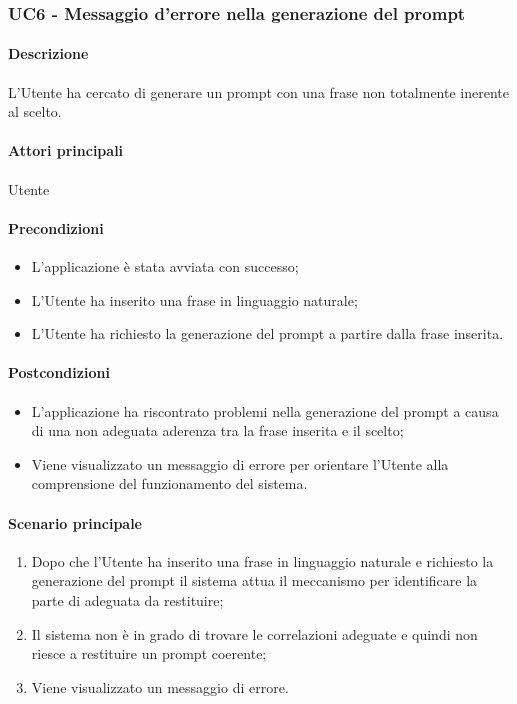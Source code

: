 \subsubsection{UC6 - Messaggio d'errore nella generazione del prompt}\label{UC6}
\paragraph*{Descrizione}
L’Utente ha cercato di generare un prompt con una frase non totalmente inerente al  scelto.

\paragraph*{Attori principali}
Utente

\paragraph*{Precondizioni}
\begin{itemize}
  \item L'applicazione è stata avviata con successo;
  \item L’Utente ha inserito una frase in linguaggio naturale;
  \item L’Utente ha richiesto la generazione del prompt a partire dalla frase inserita.  
\end{itemize}

\paragraph*{Postcondizioni}
\begin{itemize}
  \item L’applicazione ha riscontrato problemi nella generazione del prompt a causa di una non adeguata aderenza tra la frase inserita e il  scelto;
  \item Viene visualizzato un messaggio di errore per orientare l’Utente alla comprensione del funzionamento del sistema.
\end{itemize}

\paragraph*{Scenario principale}
\begin{enumerate}
  \item Dopo che l’Utente ha inserito una frase in linguaggio naturale e richiesto la generazione del prompt il sistema attua il meccanismo per identificare la parte di  adeguata da restituire;
  \item Il sistema non è in grado di trovare le correlazioni adeguate e quindi non riesce a restituire un prompt coerente;
  \item Viene visualizzato un messaggio di errore.
\end{enumerate}
